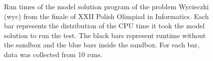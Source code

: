\documentclass[en]{pracamgr}
\begin{document}
\begin{appendices}
\begin{figure}[H]
\caption{Run times of the model solution program of the problem Wycieczki (wyc) from the finale of XXII Polish Olimpiad in Informatics. Each bar represents the distribution of the CPU time it took the model solution to run the test. The black bars represent runtime without the sandbox and the blue bars inside the sandbox. For each bar, data was collected from 10 runs.}
\label{figure:wyc_model_solution_cpu_time}
\end{figure}

\end{appendices}
\end{document}
